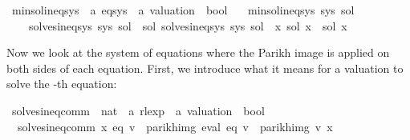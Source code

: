 \begin{isabellebody}
\begin{isamarkuptext}
\end{isamarkuptext}\isamarkuptrue%
\isamarkupfalse%
\ min{\isacharunderscore}{\kern0pt}sol{\isacharunderscore}{\kern0pt}ineq{\isacharunderscore}{\kern0pt}sys\ {\isacharcolon}{\kern0pt}{\isacharcolon}{\kern0pt}\ {\isachardoublequoteopen}{\isacharprime}{\kern0pt}a\ eq{\isacharunderscore}{\kern0pt}sys\ {\isasymRightarrow}\ {\isacharprime}{\kern0pt}a\ valuation\ {\isasymRightarrow}\ bool{\isachardoublequoteclose}\ \isanewline
\ \ {\isachardoublequoteopen}min{\isacharunderscore}{\kern0pt}sol{\isacharunderscore}{\kern0pt}ineq{\isacharunderscore}{\kern0pt}sys\ sys\ sol\ {\isasymequiv}\isanewline
\ \ \ \ solves{\isacharunderscore}{\kern0pt}ineq{\isacharunderscore}{\kern0pt}sys\ sys\ sol\ {\isasymand}\ {\isacharparenleft}{\kern0pt}{\isasymforall}sol{\isacharprime}{\kern0pt}{\isachardot}{\kern0pt}\ solves{\isacharunderscore}{\kern0pt}ineq{\isacharunderscore}{\kern0pt}sys\ sys\ sol{\isacharprime}{\kern0pt}\ {\isasymlongrightarrow}\ {\isacharparenleft}{\kern0pt}{\isasymforall}x{\isachardot}{\kern0pt}\ sol\ x\ {\isasymsubseteq}\ sol{\isacharprime}{\kern0pt}\ x{\isacharparenright}{\kern0pt}{\isacharparenright}{\kern0pt}{\isachardoublequoteclose}%
\isadelimdocument
%
\endisadelimdocument
%
\isatagdocument
%
\isamarkuptrue%
%
\endisatagdocument
{\isafolddocument}%
%
\isadelimdocument
%
\endisadelimdocument
%
\begin{isamarkuptext}%
Now we look at the system of equations where the Parikh image is applied on both sides of
each equation. First, we introduce what it means for a valuation  to solve the -th equation:%
\end{isamarkuptext}\isamarkuptrue%
\isamarkupfalse%
\ solves{\isacharunderscore}{\kern0pt}ineq{\isacharunderscore}{\kern0pt}comm\ {\isacharcolon}{\kern0pt}{\isacharcolon}{\kern0pt}\ {\isachardoublequoteopen}nat\ {\isasymRightarrow}\ {\isacharprime}{\kern0pt}a\ rlexp\ {\isasymRightarrow}\ {\isacharprime}{\kern0pt}a\ valuation\ {\isasymRightarrow}\ bool{\isachardoublequoteclose}\ \isanewline
\ \ {\isachardoublequoteopen}solves{\isacharunderscore}{\kern0pt}ineq{\isacharunderscore}{\kern0pt}comm\ x\ eq\ v\ {\isasymequiv}\ parikh{\isacharunderscore}{\kern0pt}img\ {\isacharparenleft}{\kern0pt}eval\ eq\ v{\isacharparenright}{\kern0pt}\ {\isasymsubseteq}\ parikh{\isacharunderscore}{\kern0pt}img\ {\isacharparenleft}{\kern0pt}v\ x{\isacharparenright}{\kern0pt}{\isachardoublequoteclose}%

\end{isabellebody}
